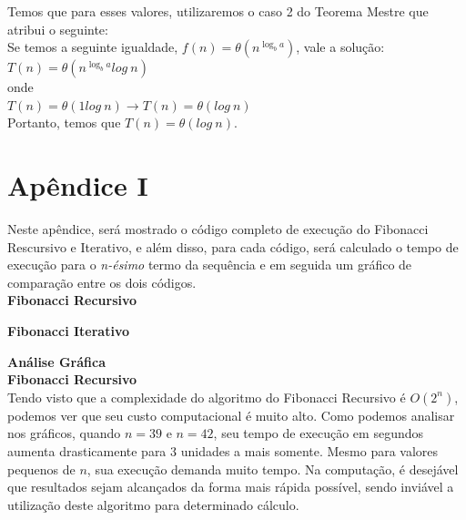 \documentclass[a4paper, 12pt]{article}
\begin{document}
Temos que para esses valores, utilizaremos o caso 2 do Teorema Mestre que atribui o seguinte:\\

Se temos a seguinte igualdade, $f(n) = \theta(n^{\log_b a})$, vale a solução:\\

$T(n) = \theta(n^{\log_b a}log \ n)$ \\

onde \\

$T(n) = \theta(1log \ n) \rightarrow T(n) = \theta(log \ n)$ \\

Portanto, temos que $T(n) = \theta(log \ n)$.

\newpage
\section{Apêndice I}
Neste apêndice, será mostrado o código completo de execução do Fibonacci Rescursivo e Iterativo, e além disso, para cada código, será calculado o tempo de execução para o {\it n-ésimo} termo da sequência e em seguida um gráfico de comparação entre os dois códigos.\\

{\large\bf Fibonacci Recursivo}

\vspace{0.3cm}
{\large\bf\quad Fibonacci Iterativo}


\newpage

{\LARGE\bf Análise Gráfica}\\

{\Large\bf Fibonacci Recursivo}\\

Tendo visto que a complexidade do algoritmo do Fibonacci Recursivo é $O(2^n)$, podemos ver que seu custo computacional é muito alto. Como podemos analisar nos gráficos, quando $n=39$ e $n=42$, seu tempo de execução em segundos aumenta drasticamente para 3 unidades a mais somente. Mesmo para valores pequenos de $n$, sua execução demanda muito tempo. Na computação, é desejável que resultados sejam alcançados da forma mais rápida possível, sendo inviável a utilização deste algoritmo para determinado cálculo.
\end{document}
